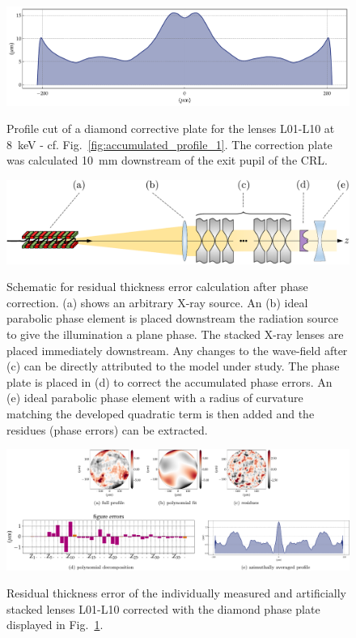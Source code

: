 \begin{refsection}
\begin{figure}[t]
        \centering
        {\includegraphics[width=0.6\linewidth]{figures/ch06/CDn_individual_8p0keV_n_10.0_lsp2p0mm_cpp10p0mm_phase_correction_plate_cut_2.pdf}}
        \caption[Diamond correction plate profile cut]{Profile cut of a diamond corrective plate for the lenses L01-L10 at 8~keV - cf. Fig.~\ref{fig:accumulated_profile_1}. The correction plate was calculated 10~mm downstream of the exit pupil of the CRL.}\label{fig:plate_profile}
\end{figure}

\begin{figure}[t]
        \centering
        {\includegraphics[width=0.6\linewidth]{figures/ch06/recovered_phase_corrected.pdf}}
        \caption[Schematic for residual thickness error calculation after phase correction]{Schematic for residual thickness error calculation after phase correction. (a) shows an arbitrary X-ray source. An (b) ideal parabolic phase element is placed downstream the radiation source to give the illumination a plane phase. The stacked X-ray lenses are placed immediately downstream. Any changes to the wave-field after (c) can be directly attributed to the model under study. The phase plate is placed in (d) to correct the accumulated phase errors. An (e) ideal parabolic phase element with a radius of curvature matching the developed quadratic term is then added and the residues (phase errors) can be extracted.}\label{fig:recovered_phase_corrected}
\end{figure}

\begin{figure}[t]
        \centering
        {\includegraphics[width=1\linewidth]{figures/ch06/residual_profile.pdf}}
        \caption[Residual profile after phase correction]{Residual thickness error of the individually measured and artificially stacked lenses L01-L10 corrected with the diamond phase plate displayed in Fig.~\ref{fig:plate_profile}.}\label{fig:residual_profile}
\end{figure}


\end{refsection}
